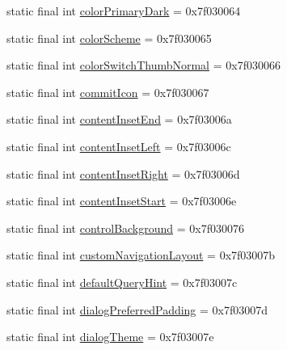 \begin{DoxyCompactItemize}
\item 
static final int \mbox{\hyperlink{classcom_1_1google_1_1android_1_1gms_1_1R_1_1attr_a7fb42ae5f7434078cb681e5d442e57c5}{color\+Primary\+Dark}} = 0x7f030064
\item 
static final int \mbox{\hyperlink{classcom_1_1google_1_1android_1_1gms_1_1R_1_1attr_a34861bb291375718992038fa09c8ca67}{color\+Scheme}} = 0x7f030065
\item 
static final int \mbox{\hyperlink{classcom_1_1google_1_1android_1_1gms_1_1R_1_1attr_a3e85fc33e0e7b4d5e58ba8b084759691}{color\+Switch\+Thumb\+Normal}} = 0x7f030066
\item 
static final int \mbox{\hyperlink{classcom_1_1google_1_1android_1_1gms_1_1R_1_1attr_af176ce3147c266cc8767e479de6a9004}{commit\+Icon}} = 0x7f030067
\item 
static final int \mbox{\hyperlink{classcom_1_1google_1_1android_1_1gms_1_1R_1_1attr_a814a31a1630f5c2850b1f9289a61dec4}{content\+Inset\+End}} = 0x7f03006a
\item 
static final int \mbox{\hyperlink{classcom_1_1google_1_1android_1_1gms_1_1R_1_1attr_a6e34bcea9b69ad4130e249ccd6026a85}{content\+Inset\+Left}} = 0x7f03006c
\item 
static final int \mbox{\hyperlink{classcom_1_1google_1_1android_1_1gms_1_1R_1_1attr_aa01a35701a74c899bc5eabcc3077c826}{content\+Inset\+Right}} = 0x7f03006d
\item 
static final int \mbox{\hyperlink{classcom_1_1google_1_1android_1_1gms_1_1R_1_1attr_a720cea282954b1123112bbda1a82d4c3}{content\+Inset\+Start}} = 0x7f03006e
\item 
static final int \mbox{\hyperlink{classcom_1_1google_1_1android_1_1gms_1_1R_1_1attr_af324ee5fa7199775d5cd0baa72cdb31c}{control\+Background}} = 0x7f030076
\item 
static final int \mbox{\hyperlink{classcom_1_1google_1_1android_1_1gms_1_1R_1_1attr_ad35961c998bfaffc6e9ec34f47b262e6}{custom\+Navigation\+Layout}} = 0x7f03007b
\item 
static final int \mbox{\hyperlink{classcom_1_1google_1_1android_1_1gms_1_1R_1_1attr_a545448dd858039af182f47c3c5765d6b}{default\+Query\+Hint}} = 0x7f03007c
\item 
static final int \mbox{\hyperlink{classcom_1_1google_1_1android_1_1gms_1_1R_1_1attr_a9743079b39c0f375153dfecf17613fdf}{dialog\+Preferred\+Padding}} = 0x7f03007d
\item 
static final int \mbox{\hyperlink{classcom_1_1google_1_1android_1_1gms_1_1R_1_1attr_a1b2cd388594adcf2b3d6ebaba9da8f0e}{dialog\+Theme}} = 0x7f03007e

\end{DoxyCompactItemize}
